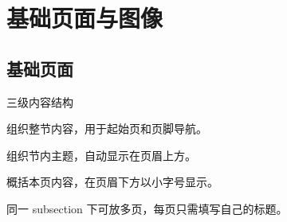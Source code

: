 \section{基础页面与图像}
\subsection{基础页面}




\begin{frame}{三级内容结构}
      \begin{description}[Subsection]
            \item[Section] 组织整节内容，用于起始页和页脚导航。
            \item[Subsection] 组织节内主题，自动显示在页眉上方。
            \item[Frametitle] 概括本页内容，在页眉下方以小字号显示。
            \item[连续页面] 同一 subsection 下可放多页，每页只需填写自己的标题。
      \end{description}
\end{frame}





